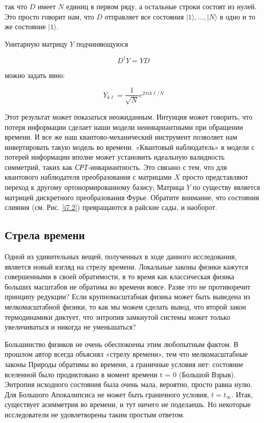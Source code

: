 \documentclass[main.tex]{subfiles}
\begin{document}
так что $D$ имеет $N$ единиц в первом ряду, а остальные строки состоят из нулей. Это просто говорит нам, что $D$ отправляет все состояния $| 1\rangle, ..., | N\rangle $ в одно и то же состояние $| 1\rangle$.

Унитарную матрицу $Y$ подчиняющуюся

\begin{equation}\label{7.5}
	D^\dagger Y = Y D
\end{equation}

можно задать явно:

\begin{equation}\label{7.6}
	Y_{k \ell}=\frac{1}{\sqrt{N}} e^{2 \pi i k \ell / N}
\end{equation}

Этот результат может показаться неожиданным. Интуиция может говорить, что потеря информации сделает наши модели неинвариантными при обращении времени. И все же наш квантово-механический инструмент позволяет нам инвертировать такую модель во времени. «Квантовый наблюдатель» в модели с потерей информации вполне может установить идеальную валидность симметрий, таких как \textit{СРТ}-инвариантность. Это связано с тем, что для квантового наблюдателя преобразования с матрицами $X$ просто представляют переход к другому ортонормированному базису; Матрица $Y$ по существу является матрицей дискретного преобразования Фурье. Обратите внимание, что состояния слияния (см. Рис. \ref{i7.2}) превращаются в райские сады, и наоборот.

\subsection{Стрела времени}\label{ch7.3}

Одной из удивительных вещей, полученных в ходе данного исследования, является новый взгляд на стрелу времени. Локальные законы физики кажутся совершенными в своей обратимости, в то время как классическая физика больших масштабов не обратима во времени вовсе. Разве это не противоречит принципу редукции? Если крупномасштабная физика может быть выведена из мелкомасштабной физики, то как мы можем сделать вывод, что второй закон термодинамики диктует, что энтропия замкнутой системы может только увеличиваться и никогда не уменьшаться?

Большинство физиков не очень обеспокоены этим любопытным фактом. В прошлом  автор всегда объяснял «стрелу времени», тем  что  мелкомасштабные законы Природы обратимы во времени, а граничные условия нет: состояние вселенной было продиктовано в момент времени t = 0 (Большой Взрыв). Энтропия исходного состояния была очень мала, вероятно, просто равна нулю. Для Большого Апокалипсиса не может быть граничного условия, $t = t_\infty$. Итак, существует асимметрия во времени, и тут ничего не поделаешь. Но некоторые исследователи не удовлетворены таким простым ответом.
\end{document}
